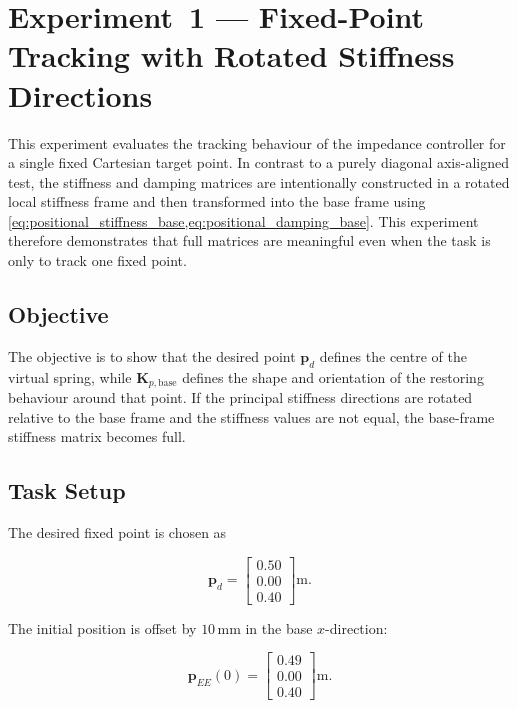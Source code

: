 \section{Experiment~1 --- Fixed-Point Tracking with Rotated Stiffness Directions}
\label{sec:exp_tracking}

This experiment evaluates the tracking behaviour of the impedance controller
for a single fixed Cartesian target point. In contrast to a purely diagonal
axis-aligned test, the stiffness and damping matrices are intentionally
constructed in a rotated local stiffness frame and then transformed into the
base frame using \cref{eq:positional_stiffness_base,eq:positional_damping_base}. This experiment
therefore demonstrates that full matrices are meaningful even when the task is
only to track one fixed point.

\subsection{Objective}

The objective is to show that the desired point \(\mathbf{p}_d\) defines the
centre of the virtual spring, while \(\mathbf{K}_{p,\mathrm{base}}\) defines
the shape and orientation of the restoring behaviour around that point. If the
principal stiffness directions are rotated relative to the base frame and the
stiffness values are not equal, the base-frame stiffness matrix becomes full.

\subsection{Task Setup}

The desired fixed point is chosen as

\begin{equation}
\label{eq:exp1_pd}
\mathbf{p}_d =
\begin{bmatrix}
0.50\\0.00\\0.40
\end{bmatrix}
\mathrm{m}.
\end{equation}

The initial position is offset by \(10\,\mathrm{mm}\) in the base \(x\)-direction:

\begin{equation}
\label{eq:exp1_initial}
\mathbf{p}_{EE}(0) =
\begin{bmatrix}
0.49\\0.00\\0.40
\end{bmatrix}
\mathrm{m}.
\end{equation}

